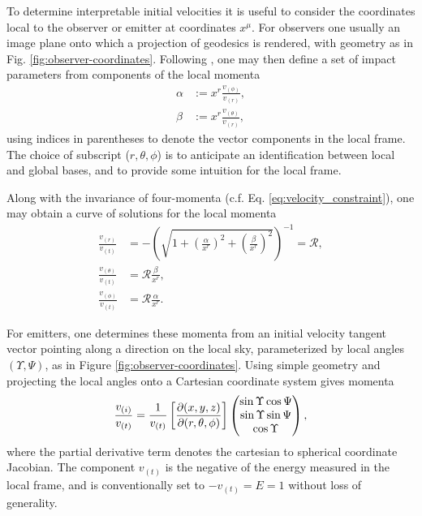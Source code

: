 To determine interpretable initial velocities it is useful to consider the coordinates local to the observer or emitter at coordinates $x^\mu$. For observers one usually an image plane onto which a projection of geodesics is rendered, with geometry as in Fig. \ref{fig:observer-coordinates}. Following \cite{cunningham_optical_1973}, one may then define a set of impact parameters from components of the local momenta
\begin{align}
    \alpha &:=  x^r \frac{v_{(\phi)}}{v_{(r)}}, \\
    \beta &:= x^r \frac{v_{(\theta)}}{v_{(r)}},
\end{align}
using indices in parentheses to denote the vector components in the local frame. The choice of subscript ($r, \theta, \phi$) is to anticipate an identification between local and global bases, and to provide some intuition for the local frame.

Along with the invariance of four-momenta (c.f. Eq. \eqref{eq:velocity_constraint}), one may obtain a curve of solutions for the local momenta
\begin{align}
    \frac{v_{(r)}}{v_{(t)}} &= -\left( \sqrt{1 + \left(\frac{\alpha}{x^r}\right)^2 + \left(\frac{\beta}{x^r}\right)^2} \right)^{-1} = \mathscr{R}, \\
    \frac{v_{(\theta)}}{v_{(t)}} &= \mathscr{R} \frac{\beta}{x^r}, \\
    \frac{v_{(\phi)}}{v_{(t)}} &= \mathscr{R} \frac{\alpha}{x^r}.
\end{align}

For emitters, one determines these momenta from an initial velocity tangent vector pointing along a direction on the local sky, parameterized by local angles $(\Upsilon, \Psi)$, as in Figure \ref{fig:observer-coordinates}. Using simple geometry and projecting the local angles onto a Cartesian coordinate system gives momenta
\begin{equation}
    \frac{v_{(i)}}{v_{(t)}} = \frac{1}{v_{(t)}}
    \left[\frac{\partial (x, y, z)}{\partial (r, \theta, \phi)}\right]
    \left(
    \begin{matrix}
        \sin \Upsilon \cos \Psi \\
        \sin \Upsilon \sin \Psi \\
        \cos \Upsilon \\
    \end{matrix}
    \right),
\end{equation}
where the partial derivative term denotes the cartesian to spherical coordinate Jacobian. The component $v_{(t)}$ is the negative of the energy measured in the local frame, and is conventionally set to $-v_{(t)} = E = 1$ without loss of generality. 

